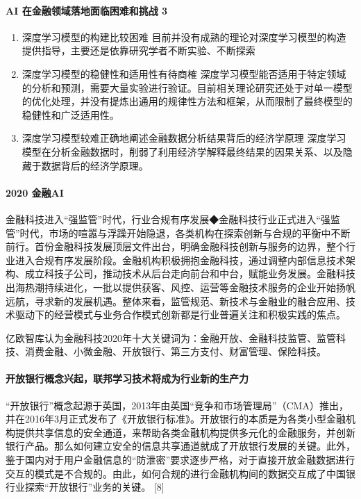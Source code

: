 \documentclass[letterpaper,10pt,english]{sphinxmanual}
\begin{document}
\paragraph{AI 在金融领域落地面临困难和挑战 3\sphinxfootnotemark[756]}
\label{\detokenize{chapter_project/AI_Finance:ai-3}}%
\begin{footnotetext}[756]\sphinxAtStartFootnote
{}
%
\end{footnotetext}\ignorespaces \begin{enumerate}
%
\item {} 
深度学习模型的构建比较困难
目前并没有成熟的理论对深度学习模型的构造提供指导，主要还是依靠研究学者不断实验、不断探索

\item {} 
深度学习模型的稳健性和适用性有待商榷
深度学习模型能否适用于特定领域的分析和预测，需要大量实验进行验证。目前相关理论研究还处于对单一模型的优化处理，并没有提炼出通用的规律性方法和框架，从而限制了最终模型的稳健性和广泛适用性。

\item {} 
深度学习模型较难正确地阐述金融数据分析结果背后的经济学原理
深度学习模型在分析金融数据时，削弱了利用经济学解释最终结果的因果关系、以及隐藏于数据背后的经济学原理。

\end{enumerate}


\paragraph{2020 金融AI}
\label{\detokenize{chapter_project/AI_Finance:id14}}
金融科技进入“强监管”时代，行业合规有序发展◆金融科技行业正式进入“强监管”时代，市场的喧嚣与浮躁开始隐退，各类机构在探索创新与合规的平衡中不断前行。首份金融科技发展顶层文件出台，明确金融科技创新与服务的边界，整个行业进入合规有序发展阶段。金融机构积极拥抱金融科技，通过调整内部信息技术架构、成立科技子公司，推动技术从后台走向前台和中台，赋能业务发展。金融科技出海热潮持续进化，一批以提供获客、风控、运营等金融技术服务的企业开始扬帆远航，寻求新的发展机遇。整体来看，监管规范、新技术与金融业的融合应用、技术驱动下的经营模式与业务合作模式创新都是行业普遍关注和积极实践的焦点。

亿欧智库认为金融科技2020年十大关键词为：金融开放、金融科技监管、监管科技、消费金融、小微金融、开放银行、第三方支付、财富管理、保险科技。


\paragraph{开放银行概念兴起，联邦学习技术将成为行业新的生产力}
\label{\detokenize{chapter_project/AI_Finance:id15}}
“开放银行”概念起源于英国，2013年由英国“竞争和市场管理局”（CMA）推出，并在2016年3月正式发布了《开放银行标准》。开放银行的本质是为各类小型金融机构提供共享信息的安全通道，来帮助各类金融机构提供多元化的金融服务，并创新银行产品。那么如何建立安全的信息共享通道就成了开放银行发展的关键。此外，鉴于国内对于用户金融信息的“防泄密”要求逐步严格，对于直接开放金融数据进行交互的模式是不合规的。由此，如何合规的进行金融机构间的数据交互成了中国银行业探索“开放银行”业务的关键。
{[}8{]}
\end{document}
